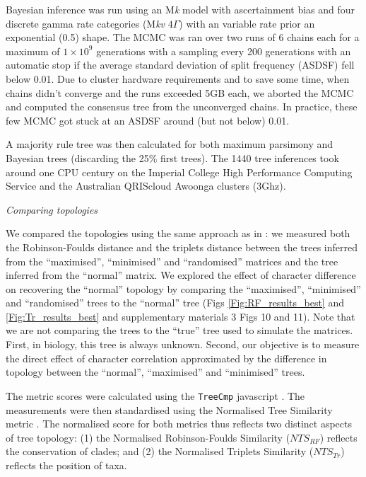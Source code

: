 \documentclass[12pt,letterpaper]{article}
\renewcommand{\subsection}[1]{%
\bigskip
\begin{center}
\begin{large}
\normalfont\itshape #1
\end{large}
\end{center}}
\begin{document}
Bayesian inference was run using an M\textit{k} model with ascertainment bias and four discrete gamma rate categories (M\textit{kv} $4\Gamma$) with an variable rate prior an exponential (0.5) shape.
The MCMC was ran over two runs of 6 chains each for a maximum of $1\times10^9$ generations with a sampling every 200 generations with an automatic stop if the average standard deviation of split frequency (ASDSF) fell below 0.01.
Due to cluster hardware requirements and to save some time, when chains didn't converge and the runs exceeded 5GB each, we aborted the MCMC and computed the consensus tree from the unconverged chains.
In practice, these few MCMC got stuck at an ASDSF around (but not below) 0.01.

A majority rule tree was then calculated for both maximum parsimony and Bayesian trees (discarding the 25\% first trees).
The 1440 tree inferences took around one CPU century on the Imperial College High Performance Computing Service \citep[2-3GHz clock rate;][]{HPC} and the Australian QRIScloud Awoonga clusters (3Ghz).

\subsection{Comparing topologies}
We compared the topologies using the same approach as in \cite{Guillerme2016146}: we measured both the Robinson-Foulds distance \citep{RF1981} and the triplets distance \citep{dobson1975triplets} between the trees inferred from the ``maximised'', ``minimised'' and ``randomised'' matrices and the tree inferred from the ``normal'' matrix.
We explored the effect of character difference on recovering the ``normal'' topology by comparing the ``maximised'', ``minimised'' and ``randomised'' trees to the ``normal'' tree (Figs \ref{Fig:RF_results_best} and \ref{Fig:Tr_results_best} and supplementary materials 3 Figs 10 and 11).
Note that we are not comparing the trees to the ``true'' tree used to simulate the matrices.
First, in biology, this tree is always unknown.
Second, our objective is to measure the direct effect of character correlation approximated by the difference in topology between the ``normal'', ``maximised'' and ``minimised'' trees.

The metric scores were calculated using the \texttt{TreeCmp} javascript \citep{Bogdanowicz2012}.
The measurements were then standardised using the Normalised Tree Similarity metric \citep[$NTS$; centering and scaling the metric score to the number of taxa;][]{Bogdanowicz2012,Guillerme2016146}.
The normalised score for both metrics thus reflects two distinct aspects of tree topology: (1) the Normalised Robinson-Foulds Similarity ($NTS_{RF}$)  reflects the conservation of clades; and (2) the Normalised Triplets Similarity ($NTS_{Tr}$) reflects the position of taxa.
\end{document}
